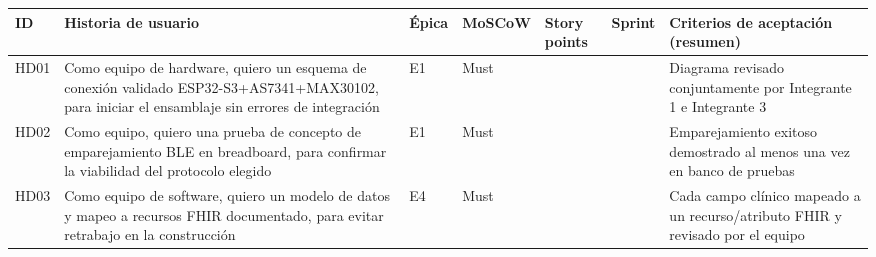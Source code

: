 \documentclass[11pt,a4paper]{article}
\begin{document}
{\small
\begin{longtable}[]{@{}
  >{\raggedright\arraybackslash}p{}
  >{\raggedright\arraybackslash}p{}
  >{\raggedright\arraybackslash}p{}
  >{\raggedright\arraybackslash}p{}
  >{\raggedright\arraybackslash}p{}
  >{\raggedright\arraybackslash}p{}
  >{\raggedright\arraybackslash}p{}@{}}
\toprule\noalign{}
\begin{minipage}[b]{\linewidth}\raggedright
ID
\end{minipage} & \begin{minipage}[b]{\linewidth}\raggedright
Historia de usuario
\end{minipage} & \begin{minipage}[b]{\linewidth}\raggedright
Épica
\end{minipage} & \begin{minipage}[b]{\linewidth}\raggedright
MoSCoW
\end{minipage} & \begin{minipage}[b]{\linewidth}\raggedright
Story points
\end{minipage} & \begin{minipage}[b]{\linewidth}\raggedright
Sprint
\end{minipage} & \begin{minipage}[b]{\linewidth}\raggedright
Criterios de aceptación (resumen)
\end{minipage} \\
\midrule\noalign{}
\endhead
\bottomrule\noalign{}
\endlastfoot
HD01 & Como equipo de hardware, quiero un esquema de conexión validado ESP32-S3+AS7341+MAX30102, para iniciar el ensamblaje sin errores de integración & E1 & Must & 5 & 1 & Diagrama revisado conjuntamente por Integrante 1 e Integrante 3 \\
HD02 & Como equipo, quiero una prueba de concepto de emparejamiento BLE en breadboard, para confirmar la viabilidad del protocolo elegido & E1 & Must & 3 & 1 & Emparejamiento exitoso demostrado al menos una vez en banco de pruebas \\
HD03 & Como equipo de software, quiero un modelo de datos y mapeo a recursos FHIR documentado, para evitar retrabajo en la construcción & E4 & Must & 5 & 2 & Cada campo clínico mapeado a un recurso/atributo FHIR y revisado por el equipo \\

\end{longtable}}
\end{document}
